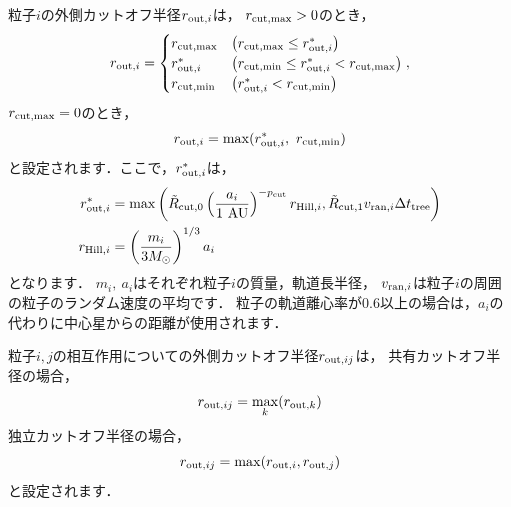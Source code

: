 \documentclass[12pt,a4paper,dvipdfmx]{jsarticle}
\begin{document}
\begin{description}
粒子$i$の外側カットオフ半径$r_{{\rm out},i}$は，
$r_{\rm cut,max}>0$のとき，
\begin{equation}
r_{{\rm out},i}=\begin{cases}
r_{\rm cut,max} & \left(r_{\rm cut,max}\leq r_{{\rm out},i}^{*}\right)\\
r_{{\rm out},i}^{*} & \left(r_{\rm cut,min}\leq r_{{\rm out},i}^{*} < r_{\rm cut,max}\right)\\
r_{\rm cut,min} & \left( r_{{\rm out},i}^{*} < r_{\rm cut,min}\right)
\end{cases}\label{rHill1},
\end{equation}
$r_{\rm cut,max}=0$のとき，
\begin{equation}
r_{{\rm out},i}=\max(r_{{\rm out},i}^{*},\ r_{\rm cut,min})\label{rHill2}
\end{equation}
と設定されます．ここで，$r_{{\rm out},i}^{*}$は，
\begin{align}
r_{{\rm out},i}^{*}&=\max\left(\tilde{R}_{\rm cut,0}\left(\frac{a_{i}}{1\ {\rm AU}}\right)^{-p_{\rm cut}}r_{{\rm Hill},i},
\tilde{R}_{\rm cut,1}v_{{\rm ran},i}\Delta t_{\rm tree}\right)\\
r_{{\rm Hill},i}&=\left(\displaystyle\frac{m_{i}}{3M_{\odot}}\right)^{1/3}a_{i}
\end{align}
となります．
$m_{i},\ a_{i}$はそれぞれ粒子$i$の質量，軌道長半径，
$v_{{\rm ran},i}$は粒子$i$の周囲の粒子のランダム速度の平均です．
粒子の軌道離心率が$0.6$以上の場合は，$a_{i}$の代わりに中心星からの距離が使用されます．

粒子$i,j$の相互作用についての外側カットオフ半径$r_{{\rm out},ij}$は，
共有カットオフ半径の場合，
\begin{equation}
r_{{\rm out},ij}=\max_{k}(r_{{\rm out},k})\label{rout1}
\end{equation}
独立カットオフ半径の場合，
\begin{equation}
r_{{\rm out},ij}=\max(r_{{\rm out},i}, r_{{\rm out},j})\label{rout2}
\end{equation}
と設定されます．


\end{description}
\end{document}

